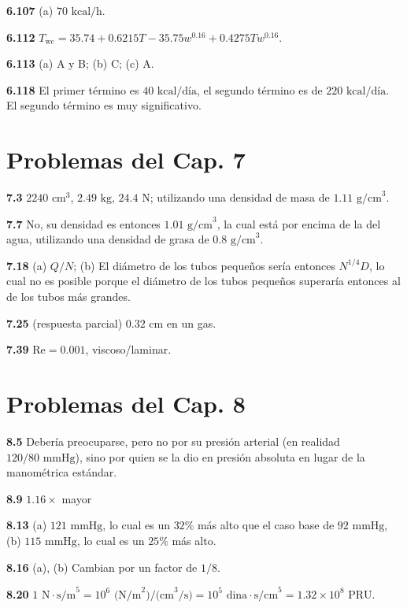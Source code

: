 \documentclass[12pt,a4paper]{book}
\begin{document}
\noindent \textbf{6.107} (a) $70\text{ kcal/h}$.

\noindent \textbf{6.112} $T_{\text{wc}} = 35.74 + 0.6215T - 35.75w^{0.16} + 0.4275T w^{0.16}$.

\noindent \textbf{6.113} (a) A y B; (b) C; (c) A.

\noindent \textbf{6.118} El primer término es $40\text{ kcal/día}$, el segundo término es de $220\text{ kcal/día}$. El segundo término es muy significativo.

\section*{Problemas del Cap. 7}

\noindent \textbf{7.3} $2240\text{ cm}^3$, $2.49\text{ kg}$, $24.4\text{ N}$; utilizando una densidad de masa de $1.11\text{ g/cm}^3$.

\noindent \textbf{7.7} No, su densidad es entonces $1.01\text{ g/cm}^3$, la cual está por encima de la del agua, utilizando una densidad de grasa de $0.8\text{ g/cm}^3$.

\noindent \textbf{7.18} (a) $Q/N$; (b) El diámetro de los tubos pequeños sería entonces $N^{1/4}D$, lo cual no es posible porque el diámetro de los tubos pequeños superaría entonces al de los tubos más grandes.

\noindent \textbf{7.25} (respuesta parcial) $0.32\text{ cm}$ en un gas.

\noindent \textbf{7.39} $\text{Re} = 0.001$, viscoso/laminar.

\section*{Problemas del Cap. 8}

\noindent \textbf{8.5} Debería preocuparse, pero no por su presión arterial (en realidad $120/80\text{ mmHg}$), sino por quien se la dio en presión absoluta en lugar de la manométrica estándar.

\noindent \textbf{8.9} $1.16\times$ mayor

\noindent \textbf{8.13} (a) $121\text{ mmHg}$, lo cual es un $32\%$ más alto que el caso base de $92\text{ mmHg}$, (b) $115\text{ mmHg}$, lo cual es un $25\%$ más alto.

\noindent \textbf{8.16} (a), (b) Cambian por un factor de $1/8$.

\noindent \textbf{8.20} $1\text{ N}\cdot\text{s/m}^5 = 10^6\text{ (N/m}^2\text{)/(cm}^3\text{/s)} = 10^5\text{ dina}\cdot\text{s/cm}^5 = 1.32 \times 10^8\text{ PRU}$.
\end{document}
